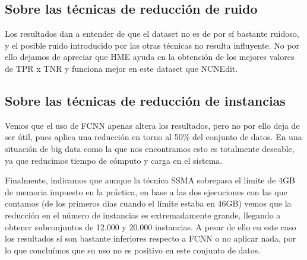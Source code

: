\subsection{Sobre las técnicas de reducción de ruido}

Los resultados dan a entender de que el dataset no es de por sí bastante ruidoso, y el posible ruido introducido por las otras técnicas no resulta influyente. No por ello dejamos de apreciar que HME ayuda en la obtención de los mejores valores de TPR x TNR y funciona mejor en este dataset que NCNEdit.

\subsection{Sobre las técnicas de reducción de instancias}

Vemos que el uso de FCNN apenas altera los resultados, pero no por ello deja de ser útil, pues aplica una reducción en torno al 50\% del conjunto de datos. En una situación de big data como la que nos encontramos esto es totalmente deseable, ya que reducimos tiempo de cómputo y carga en el sistema.

\vspace{\baselineskip}

Finalmente, indicamos que aunque la técnica SSMA sobrepasa el límite de 4GB de memoria impuesto en la práctica, en base a las dos ejecuciones con las que contamos (de los primeros días cuando el límite estaba en 46GB) vemos que la reducción en el número de instancias es extremadamente grande, llegando a obtener subconjuntos de 12.000 y 20.000 instancias.
A pesar de ello en este caso los resultados sí son bastante inferiores respecto a FCNN o no aplicar nada, por lo que concluímos que su uso no es positivo en este conjunto de datos.


